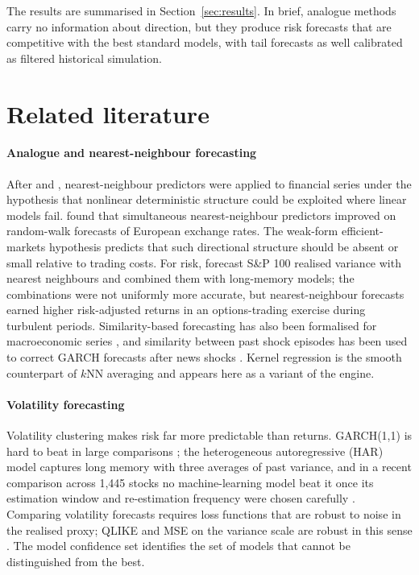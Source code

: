 \documentclass[preprint,12pt,authoryear]{elsarticle}
\begin{document}
The results are summarised in Section~\ref{sec:results}. In brief, analogue methods carry no
information about direction, but they produce risk forecasts that are competitive with the best
standard models, with tail forecasts as well calibrated as filtered historical simulation.

\section{Related literature}

\paragraph{Analogue and nearest-neighbour forecasting} After \citet{lorenz1969} and
\citet{farmer1987}, nearest-neighbour predictors were applied to financial series under the
hypothesis that nonlinear deterministic structure could be exploited where linear models fail.
\citet{fernandez1999} found that simultaneous nearest-neighbour predictors improved on random-walk
forecasts of European exchange rates. The weak-form efficient-markets hypothesis \citep{fama1970}
predicts that such directional structure should be absent or small relative to trading costs.
For risk, \citet{andrada2016} forecast S\&P 100 realised variance with nearest neighbours and
combined them with long-memory models; the combinations were not uniformly more accurate, but
nearest-neighbour forecasts earned higher risk-adjusted returns in an options-trading exercise
during turbulent periods. Similarity-based forecasting has also been formalised for macroeconomic
series \citep{dendramis2020}, and similarity between past shock episodes has been used to correct
GARCH forecasts after news shocks \citep{lundquist2024}.
Kernel regression \citep{nadaraya1964,watson1964} is the smooth counterpart of $k$NN averaging and
appears here as a variant of the engine.

\paragraph{Volatility forecasting} Volatility clustering makes risk far more predictable than
returns. GARCH(1,1) \citep{bollerslev1986} is hard to beat in large comparisons
\citep{hansen2005}; the heterogeneous autoregressive (HAR) model \citep{corsi2009} captures long
memory with three averages of past variance, and in a recent comparison across 1,445 stocks no
machine-learning model beat it once its estimation window and re-estimation frequency were chosen
carefully \citep{chassot2026}. Comparing volatility forecasts requires loss
functions that are robust to noise in the realised proxy; QLIKE and MSE on the variance scale
are robust in this sense \citep{patton2011}. The model confidence set \citep{hansen2011}
identifies the set of models that cannot be distinguished from the best.
\end{document}
